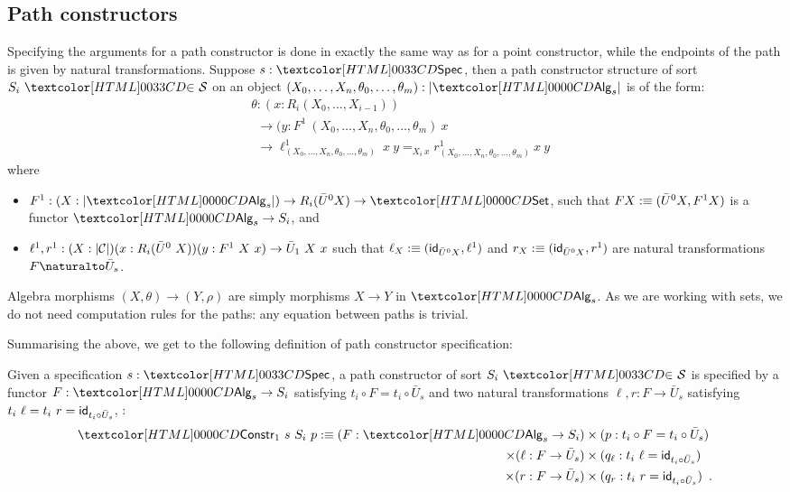 \subsection{Path constructors}
\label{path-constructors}

Specifying the arguments for a path constructor is done in exactly the
same way as for a point constructor, while the endpoints of the path
is given by natural transformations. Suppose $s : \specty$, then a path
constructor structure of sort $\sortsin{S_i}{\Ss}$ on an object
$(X_0, \hdots, X_n, \theta_0,\hdots,\theta_m) : | \Alg_s |$ is of the
form:
\begin{align*}
  &\theta : (x : R_i (X_0, \hdots, X_{i-1})) \\
  &\ \ \to (y : F^1\ (X_0, \hdots, X_n, \theta_0, \hdots, \theta_m)\ x \\
  &\ \ \to \ell^1_{(X_0,\hdots,X_n,\theta_0,\hdots,\theta_m)}\ x\ y =_{X_i\ x} r^1_{(X_0,\hdots,X_n,\theta_0,\hdots,\theta_m)}\ x\ y 
\end{align*}
where
\begin{itemize}
\item $F^1 : (X : | \Alg_s |) \to R_i (\bar{U}^0 X) \to \Set$, such
  that $F X :\equiv (\bar{U}^0 X, F^1 X)$ is a functor $\Alg_s \to S_i$, and
\item
  $\ell^1, r^1 : (X : | \mathcal{C} |) (x : R_i (\bar{U}^0\ X)) (y : F^1\ X\ x)
  \to \bar{U}_1\ X\ x$
  such that $\ell_X \ddefeq (\id_{\bar{U}^0 X}, \ell^1)$ and
  $r_X \ddefeq (\id_{\bar{U}^0 X}, r^1)$ are natural transformations
  $\Nat{F}{\bar{U}_s}$.
\end{itemize}
Algebra morphisms $(X,\theta) \to (Y,\rho)$ are simply morphisms
$X \to Y$ in $\Alg_s$. As we are working with sets, we do not need
computation rules for the paths: any equation between paths is
trivial.

Summarising the above, we get to the following definition of
path constructor specification:

\begin{definition}
  Given a specification $s : \specty$, a path constructor of sort
  $\sortsin{S_i}{\Ss}$ is specified by a functor $F : \Alg_s \to S_i$
  satisfying $t_i \circ F = t_i \circ \bar{U}_s$ and two natural
  transformations $\ell, r : F \to \bar{U}_s$ satisfying
  $t_i\ \ell = t_i\ r = \id_{t_i \circ \bar{U}_s}$, \ie:
\begin{align*}
  \Constr_1\ s\ S_i\ p \ddefeq (F : \Alg_s \to S_i) &\times (p : t_i \circ F = t_i \circ \bar{U}_s) \\ 
  \times (\ell : F \to \bar{U}_s) &\times (q_\ell : t_i\ \ell = \id_{t_i \circ \bar{U}_s}) \\ 
  \times (r : F \to \bar{U}_s) &\times (q_r : t_i\ r = \id_{t_i \circ \bar{U}_s}) \enspace .
\end{align*}
\end{definition}

